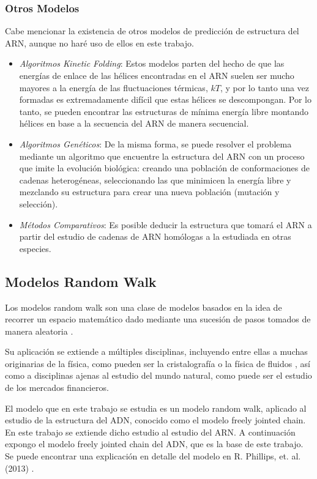 \documentclass[a4paper,11pt,titlepage]{article}
\theoremstyle{definition}
\begin{document}
\subsubsection{Otros Modelos}\label{subsubsec:others}

Cabe mencionar la existencia de otros modelos de predicción de estructura del ARN, aunque no haré uso de ellos en este trabajo.

\begin{itemize}
    \item \textit{Algoritmos Kinetic Folding}: Estos modelos parten del hecho de que las energías de enlace de las hélices encontradas en el ARN suelen ser mucho mayores a la energía de las fluctuaciones térmicas, $kT$, y por lo tanto una vez formadas es extremadamente difícil que estas hélices se descompongan. Por lo tanto, se pueden encontrar las estructuras de mínima energía libre montando hélices en base a la secuencia del ARN de manera secuencial.
    \item \textit{Algoritmos Genéticos}: De la misma forma, se puede resolver el problema mediante un algoritmo que encuentre la estructura del ARN con un proceso que imite la evolución biológica: creando una población de conformaciones de cadenas heterogéneas, seleccionando las que minimicen la energía libre y mezclando su estructura para crear una nueva población (mutación y selección).
    \item \textit{Métodos Comparativos}: Es posible deducir la estructura que tomará el ARN a partir del estudio de cadenas de ARN homólogas a la estudiada en otras especies.
\end{itemize}


\subsection{Modelos Random Walk}\label{subsec:rndwalk}

Los modelos random walk son una clase de modelos basados en la idea de recorrer un espacio matemático dado mediante una sucesión de pasos tomados de manera aleatoria \cite{doyle} \cite{pearson}.

Su aplicación se extiende a múltiples disciplinas, incluyendo entre ellas a muchas originarias de la física, como pueden ser la cristalografía o la física de fluidos \cite{weiss}, así como a disciplinas ajenas al estudio del mundo natural, como puede ser el estudio de los mercados financieros\cite{blsch}.

El modelo que en este trabajo se estudia es un modelo random walk, aplicado al estudio de la estructura del ADN, conocido como el modelo freely jointed chain. En este trabajo se extiende dicho estudio al estudio del ARN. A continuación expongo el modelo freely jointed chain del ADN, que es la base de este trabajo. Se puede encontrar una explicación en detalle del modelo en R. Phillips, et. al. (2013) \cite{phillips}.
\end{document}
